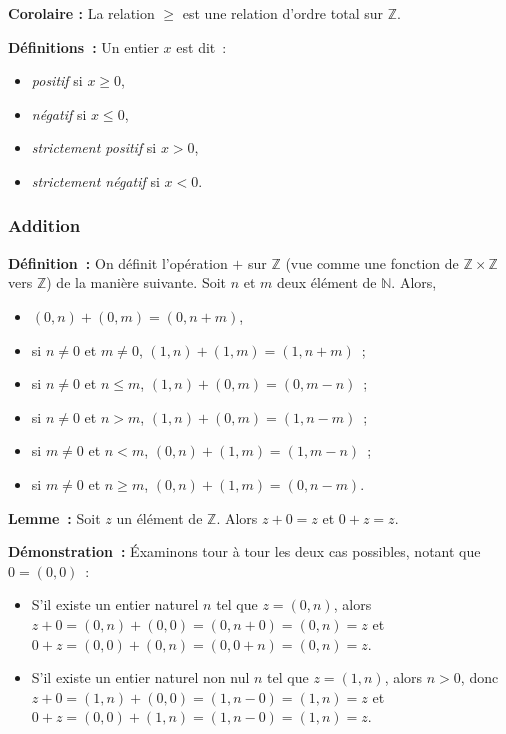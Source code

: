    \done 

\medskip

\noindent\textbf{Corolaire :} La relation $\geq$ est une relation d'ordre total sur $\mathbb{Z}$.

\medskip

\noindent\textbf{Définitions :} Un entier $x$ est dit : 
\begin{itemize}[nosep]
    \item \textit{positif} si $x \geq 0$,
    \item \textit{négatif} si $x \leq 0$,
    \item \textit{strictement positif} si $x > 0$,
    \item \textit{strictement négatif} si $x < 0$.
\end{itemize}

\subsubsection{Addition}

\noindent\textbf{Définition :} 
    On définit l'opération $+$ sur $\mathbb{Z}$ (vue comme une fonction de $\mathbb{Z} \times \mathbb{Z}$ vers $\mathbb{Z}$) de la manière suivante.
    Soit $n$ et $m$ deux élément de $\mathbb{N}$.
    Alors, 
    \begin{itemize}[nosep]
        \item $(0,n) + (0,m) = (0, n+m)$,
        \item si $n \neq 0$ et $m \neq 0$, $(1,n) + (1,m) = (1, n+m)$ ;
        \item si $n \neq 0$ et $n \leq m$, $(1,n) + (0,m) = (0, m-n)$ ;
        \item si $n \neq 0$ et $n > m$, $(1,n) + (0,m) = (1, n-m)$ ;
        \item si $m \neq 0$ et $n < m$, $(0,n) + (1,m) = (1, m-n)$ ;
        \item si $m \neq 0$ et $n \geq m$, $(0,n) + (1,m) = (0, n-m)$.
    \end{itemize}
    \sindex[isy]{$+$}

\medskip

\noindent\textbf{Lemme :} Soit $z$ un élément de $\mathbb{Z}$. 
    Alors $z + 0 = z$ et $0 + z = z$.

\medskip

\noindent\textbf{Démonstration :} Éxaminons tour à tour les deux cas possibles, notant que $0 = (0,0)$ : 
    \begin{itemize}[nosep]
        \item S'il existe un entier naturel $n$ tel que $z = (0,n)$, alors $z + 0 = (0,n) + (0,0) = (0,n+0) = (0,n) = z$ et $0 + z = (0,0) + (0,n) = (0,0+n) = (0,n) = z$.
        \item S'il existe un entier naturel non nul $n$ tel que $z = (1,n)$, alors $n > 0$, donc $z + 0 = (1,n) + (0,0) = (1,n-0) = (1,n) = z$ et $0 + z = (0,0) + (1,n) = (1,n-0) = (1,n) = z$.
    \end{itemize}
    
